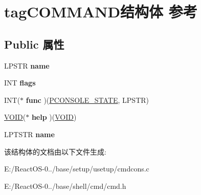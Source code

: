 \hypertarget{structtag_c_o_m_m_a_n_d}{}\section{tag\+C\+O\+M\+M\+A\+N\+D结构体 参考}
\label{structtag_c_o_m_m_a_n_d}
\subsection*{Public 属性}
\begin{DoxyCompactItemize}
\item 
\mbox{\label{structtag_c_o_m_m_a_n_d_ae5fc7e483980fb9dca17495acc88b84b}} 
L\+P\+S\+TR {\bfseries name}
\item 
\mbox{\label{structtag_c_o_m_m_a_n_d_a7b50d1179ee8bb65c1f4c59337c1c6fd}} 
I\+NT {\bfseries flags}
\item 
\mbox{\label{structtag_c_o_m_m_a_n_d_a3f1d62cb26539ccd77563b4ac375196a}} 
I\+NT($\ast$ {\bfseries func} )(\hyperlink{struct___c_o_n_s_o_l_e___s_t_a_t_e}{P\+C\+O\+N\+S\+O\+L\+E\+\_\+\+S\+T\+A\+TE}, L\+P\+S\+TR)
\item 
\mbox{\label{structtag_c_o_m_m_a_n_d_aa17774ef5525f289f3fa92facbdd3250}} 
\hyperlink{interfacevoid}{V\+O\+ID}($\ast$ {\bfseries help} )(\hyperlink{interfacevoid}{V\+O\+ID})
\item 
\mbox{\label{structtag_c_o_m_m_a_n_d_a941922b95e87b71e53e4a5f0d834ac7d}} 
L\+P\+T\+S\+TR {\bfseries name}
\end{DoxyCompactItemize}


该结构体的文档由以下文件生成\+:\begin{DoxyCompactItemize}
\item 
E\+:/\+React\+O\+S-\/0../base/setup/usetup/cmdcons.\+c\item 
E\+:/\+React\+O\+S-\/0../base/shell/cmd/cmd.\+h\end{DoxyCompactItemize}
